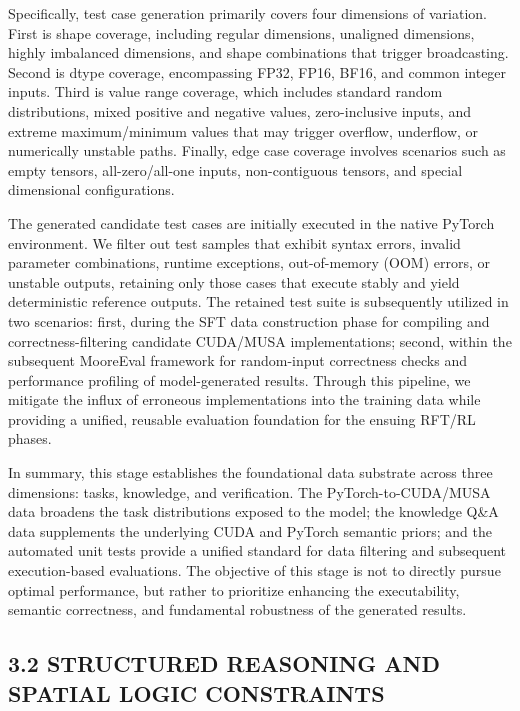 \documentclass[
  10
]{article}
\begin{document}
Specifically, test case generation primarily covers four dimensions of
variation. First is shape coverage, including regular dimensions,
unaligned dimensions, highly imbalanced dimensions, and shape
combinations that trigger broadcasting. Second is dtype coverage,
encompassing FP32, FP16, BF16, and common integer inputs. Third is value
range coverage, which includes standard random distributions, mixed
positive and negative values, zero-inclusive inputs, and extreme
maximum/minimum values that may trigger overflow, underflow, or
numerically unstable paths. Finally, edge case coverage involves
scenarios such as empty tensors, all-zero/all-one inputs, non-contiguous
tensors, and special dimensional configurations.

The generated candidate test cases are initially executed in the native
PyTorch environment. We filter out test samples that exhibit syntax
errors, invalid parameter combinations, runtime exceptions,
out-of-memory (OOM) errors, or unstable outputs, retaining only those
cases that execute stably and yield deterministic reference outputs. The
retained test suite is subsequently utilized in two scenarios: first,
during the SFT data construction phase for compiling and
correctness-filtering candidate CUDA/MUSA implementations; second,
within the subsequent MooreEval framework for random-input correctness
checks and performance profiling of model-generated results. Through
this pipeline, we mitigate the influx of erroneous implementations into
the training data while providing a unified, reusable evaluation
foundation for the ensuing RFT/RL phases.

In summary, this stage establishes the foundational data substrate
across three dimensions: tasks, knowledge, and verification. The
PyTorch-to-CUDA/MUSA data broadens the task distributions exposed to the
model; the knowledge Q\&A data supplements the underlying CUDA and
PyTorch semantic priors; and the automated unit tests provide a unified
standard for data filtering and subsequent execution-based evaluations.
The objective of this stage is not to directly pursue optimal
performance, but rather to prioritize enhancing the executability,
semantic correctness, and fundamental robustness of the generated
results.

\subsection{3.2 STRUCTURED REASONING AND SPATIAL LOGIC
CONSTRAINTS}\label{structured-reasoning-and-spatial-logic-constraints}
\end{document}
